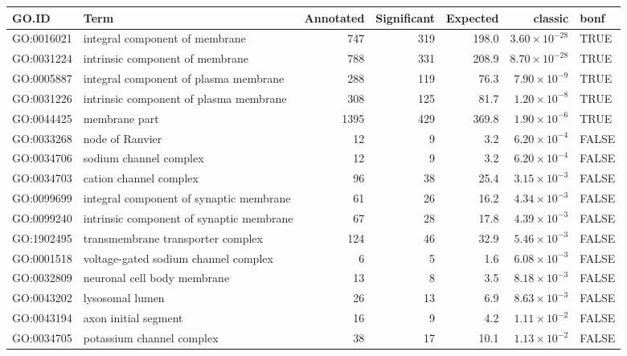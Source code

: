 \begin{table}[ht]
\centering
\begin{adjustbox}{max width=\textwidth}
\begin{tabular}{llrrrrl}
  \hline
GO.ID & Term & Annotated & Significant & Expected & classic & bonf \\ 
  \hline
GO:0016021 & integral component of membrane & 747 & 319 & 198.0 & $3.60 \times 10^{-28}$ & TRUE \\ 
  GO:0031224 & intrinsic component of membrane & 788 & 331 & 208.9 & $8.70 \times 10^{-28}$ & TRUE \\ 
  GO:0005887 & integral component of plasma membrane & 288 & 119 & 76.3 & $7.90 \times 10^{-9}$ & TRUE \\ 
  GO:0031226 & intrinsic component of plasma membrane & 308 & 125 & 81.7 & $1.20 \times 10^{-8}$ & TRUE \\ 
  GO:0044425 & membrane part & 1395 & 429 & 369.8 & $1.90 \times 10^{-6}$ & TRUE \\ 
  GO:0033268 & node of Ranvier & 12 & 9 & 3.2 & $6.20 \times 10^{-4}$ & FALSE \\ 
  GO:0034706 & sodium channel complex & 12 & 9 & 3.2 & $6.20 \times 10^{-4}$ & FALSE \\ 
  GO:0034703 & cation channel complex & 96 & 38 & 25.4 & $3.15 \times 10^{-3}$ & FALSE \\ 
  GO:0099699 & integral component of synaptic membrane & 61 & 26 & 16.2 & $4.34 \times 10^{-3}$ & FALSE \\ 
  GO:0099240 & intrinsic component of synaptic membrane & 67 & 28 & 17.8 & $4.39 \times 10^{-3}$ & FALSE \\ 
  GO:1902495 & transmembrane transporter complex & 124 & 46 & 32.9 & $5.46 \times 10^{-3}$ & FALSE \\ 
  GO:0001518 & voltage-gated sodium channel complex & 6 & 5 & 1.6 & $6.08 \times 10^{-3}$ & FALSE \\ 
  GO:0032809 & neuronal cell body membrane & 13 & 8 & 3.5 & $8.18 \times 10^{-3}$ & FALSE \\ 
  GO:0043202 & lysosomal lumen & 26 & 13 & 6.9 & $8.63 \times 10^{-3}$ & FALSE \\ 
  GO:0043194 & axon initial segment & 16 & 9 & 4.2 & $1.11 \times 10^{-2}$ & FALSE \\ 
  GO:0034705 & potassium channel complex & 38 & 17 & 10.1 & $1.13 \times 10^{-2}$ & FALSE \\ 

\end{tabular}
\end{adjustbox}
\end{table}
